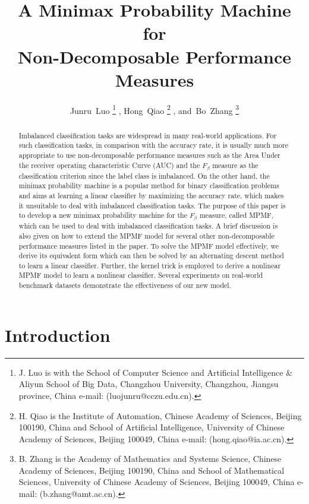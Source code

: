 \documentclass[15pt]{article}
\title{A Minimax Probability Machine for\\
Non-Decomposable Performance Measures}
\date{}
\author{Junru~Luo 
\thanks{J. Luo is with the School of Computer Science and Artificial Intelligence $\&$ Aliyun School of Big Data,
Changzhou University, Changzhou, Jiangsu province, China e-mail: (luojunru@cczu.edu.cn). } %
        , Hong~Qiao
\thanks{H. Qiao is the Institute of Automation, Chinese Academy of Sciences, Beijing 100190, China
and School of Artificial Intelligence, University of Chinese Academy of Sciences, Beijing 100049, China
e-mail: (hong.qiao@ia.ac.cn).}
        , and~Bo~Zhang
\thanks{B. Zhang is the Academy of Mathematics and Systems Science, Chinese Academy of Sciences, Beijing 100190, China
and School of Mathematical Sciences, University of Chinese Academy of Sciences, Beijing 100049, China
e-mail: (b.zhang@amt.ac.cn).}}
\begin{document}

\maketitle

\begin{abstract}
Imbalanced classification tasks are widespread in many real-world applications.
For such classification tasks, in comparison with the accuracy rate, it is usually much more
appropriate to use non-decomposable performance measures such as the Area Under the receiver operating
characteristic Curve (AUC) and the $F_\beta$ measure as the classification criterion since the label class
is imbalanced. On the other hand, the minimax probability machine is a popular method for binary
classification problems and aims at learning a linear classifier by maximizing the accuracy rate,
which makes it unsuitable to deal with imbalanced classification tasks.
The purpose of this paper is to develop a new minimax probability machine for the $F_\beta$ measure,
called MPMF, which can be used to deal with imbalanced classification tasks.
A brief discussion is also given on how to extend the MPMF model for several other non-decomposable
performance measures listed in the paper.
To solve the MPMF model effectively, we derive its equivalent form which can then be solved
by an alternating descent method to learn a linear classifier.
Further, the kernel trick is employed to derive a nonlinear MPMF model to learn a nonlinear classifier.
Several experiments on real-world benchmark datasets demonstrate the effectiveness of our new model.
\end{abstract}




\section{Introduction}
\end{document}

